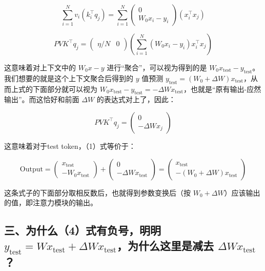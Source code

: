 \[
\sum_{i=1}^{N}v_i(k_i^\top q_j)=\sum_{i=1}^{N}\begin{pmatrix}0\\W_0x_i-y_i\end{pmatrix}(x_i^\top x_j)
\]

\[
PVK^\top q_j=\begin{pmatrix}\eta/N&0\end{pmatrix}\left(\sum_{i=1}^{N}(W_0x_i-y_i)x_i^\top x_j\right)
\]

这意味着对上下文中的 \(W_0x-y\) 进行``聚合''，可以视为得到的是 \(W_0x_{\mathrm{test}}-y_{\mathrm{test}}\)。我们想要的就是这个上下文聚合后得到的 \(y\) 值预测 \(y_{\mathrm{test}}=(W_0+\Delta W)x_{\mathrm{test}}\)，从而上式的下面部分就可以视为 \(W_0x_{\mathrm{test}}-y_{\mathrm{test}}=-\Delta W x_{\mathrm{test}}\)，也就是``原有输出-应然输出''。而这恰好和前面 \(\Delta W\) 的表达式对上了，因此：

\[
PVK^\top q_j=\begin{pmatrix}0\\-\Delta W x_j\end{pmatrix}
\]

这意味着对于test token，（1）式等价于：

\[
\mathrm{Output}
=\begin{pmatrix}x_{\mathrm{test}}\\-W_0x_{\mathrm{test}}\end{pmatrix}
+\begin{pmatrix}0\\-\Delta W x_{\mathrm{test}}\end{pmatrix}
=\begin{pmatrix}x_{\mathrm{test}}\\-(W_0+\Delta W)x_{\mathrm{test}}\end{pmatrix}
\tag{4}
\]

这条式子的下面部分取相反数后，也就得到参数变换后（按 \(W_0+\Delta W\)）应该输出的值，即注意力模块的输出。

\hypertarget{ux4e09ux4e3aux4ec0ux4e484ux5f0fux6709ux8d1fux53f7ux660eux660e-y_mathrmtestwx_mathrmtestdelta-wx_mathrmtestux4e3aux4ec0ux4e48ux8fd9ux91ccux662fux51cfux53bb-delta-wx_mathrmtest}{%
\subsection{\texorpdfstring{三、为什么（4）式有负号，明明 \(y_{\mathrm{test}}=Wx_{\mathrm{test}}+\Delta Wx_{\mathrm{test}}\)，为什么这里是减去 \(\Delta Wx_{\mathrm{test}}\)？}{三、为什么（4）式有负号，明明 y\_\{\textbackslash mathrm\{test\}\}=Wx\_\{\textbackslash mathrm\{test\}\}+\textbackslash Delta Wx\_\{\textbackslash mathrm\{test\}\}，为什么这里是减去 \textbackslash Delta Wx\_\{\textbackslash mathrm\{test\}\}？}}\label{ux4e09ux4e3aux4ec0ux4e484ux5f0fux6709ux8d1fux53f7ux660eux660e-y_mathrmtestwx_mathrmtestdelta-wx_mathrmtestux4e3aux4ec0ux4e48ux8fd9ux91ccux662fux51cfux53bb-delta-wx_mathrmtest}}

